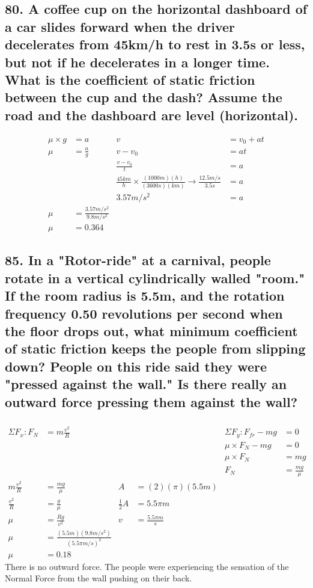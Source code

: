 \documentclass[12pt,a4paper,english]{article}
\begin{document}
\begin{flushleft}
  \subsection{80. A coffee cup on the horizontal dashboard of a car slides forward when the driver decelerates from 45km/h to rest in 3.5s or less, but not if he decelerates in a longer time. What is the coefficient of static friction between the cup and the dash? Assume the road and the dashboard are level (horizontal).}
  \begin{align*}
    \mu\times g&=a
               &v&=v_0+at
               \\
              \mu&=\frac{a}{g}&v-v_0&=at
               \\
               &&\frac{v-v_0}{t}&=a 
               \\
               && \frac{45km}{h}\times\frac{(1000m)(h)}{(3600s)(km)}\rightarrow\frac{12.5m/s}{3.5s}&=a
               \\
               &&3.57m/s^2&=a
               \\
    \mu&=\frac{3.57m/s^2}{9.8m/s^2}
    \\
    \mu&=0.364
  \end{align*}
\subsection{85. In a "Rotor-ride" at a carnival, people rotate in a vertical cylindrically walled "room." If the room radius is 5.5m, and the rotation frequency 0.50 revolutions per second when the floor drops out, what minimum coefficient of static friction keeps the people from slipping down? People on this ride said they were "pressed against the wall." Is there really an outward force pressing them against the wall?} %
  \begin{align*}
    &&&&&
    \\
    \Sigma F_x: F_N&=m\frac{v^2}{R}&&&\Sigma F_y: F_{fr}-mg&=0
    \\
    &&&&\mu\times F_N-mg&=0
    \\
       &&&&\mu \times F_N&=mg
    \\
    &&&&F_N&=\frac{mg}{\mu}
    \\
    m\frac{v^2}{R}&=\frac{mg}{\mu}
                 &A&=(2)(\pi)(5.5m)
    \\
    \frac{v^2}{R}&=\frac{g}{\mu}
    &\frac{1}{2}A&=5.5\pi m
    \\
    \mu&=\frac{Rg}{v^2}
    &v&=\frac{5.5\pi m}{s}
    \\
    \mu&=\frac{(5.5m)(9.8m/s^2)}{(5.5\pi m/s)^2}
    \\
    \mu&=0.18
  \end{align*}
  There is no outward force. The people were experiencing the sensation of the Normal Force from the wall pushing on their back.
\end{flushleft}
\end{document}
